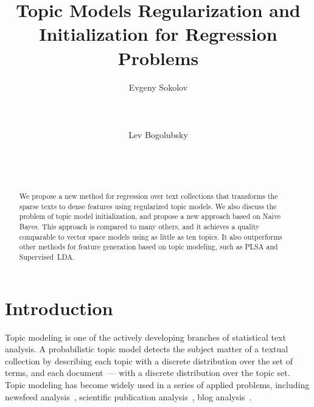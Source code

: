 \documentclass{sig-alternate-2013}
\begin{document}
\title{Topic Models Regularization and Initialization for Regression Problems}
\author{
\alignauthor
Evgeny Sokolov\\
       \\
       \\
       \\
\alignauthor
Lev Bogolubsky\\
       \\
       \\
       \\
}
\maketitle


\begin{abstract}
    We propose a new method for regression over text collections
    that transforms the sparse texts to dense features
    using regularized topic models.
    We also discuss the problem of topic model
    initialization, and propose a new approach based on Naive Bayes.
    This approach is compared to many others,
    and it achieves a quality comparable to vector space models using as little as ten topics.
    It also outperforms other methods for feature generation based on topic modeling,
    such as PLSA and Supervised~LDA.
\end{abstract}



\section{Introduction}

Topic modeling is one of the actively developing branches of statistical text analysis.
A probabilistic topic model detects the subject matter of a textual collection by describing each topic with a discrete distribution over the set of terms, and each document~--- with a discrete distribution over the topic set. Topic modeling has become widely used in a series of applied problems, including newsfeed analysis~\cite{newman06newsfeed}, scientific publication analysis~\cite{griffiths04scientific}, blog analysis~\cite{paul09blogs}.
\end{document}
